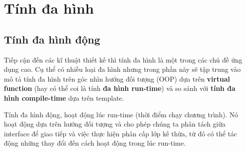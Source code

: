 \section{Tính đa hình}
\subsection{Tính đa hình động}
Tiếp cận đến các kĩ thuật thiết kế thì tính đa hình là một trong các chủ đề ứng dụng cao. Cụ thể có nhiều loại đa hình nhưng trong phần này sẽ tập trung vào mô tả tính đa hình trên góc nhìn hướng đối tượng (OOP) dựa trên \textbf{virtual function} (hay có thể coi là tính \textbf{đa hình run-time}\cite{poly-cpp}) và so sánh với \textbf{tính đa hình compile-time}\cite{poly-cpp} dựa trên template. 

Tính đa hình động, hoạt động lúc run-time (thời điểm chạy chương trình). Nó hoạt động dựa trên hướng đối tượng và cho phép chúng ta phân tách giữa interface để giao tiếp và việc thực hiện phân cấp lớp kế thừa, từ đó có thể tác động những thay đổi đến cách hoạt động trong lúc run-time.

